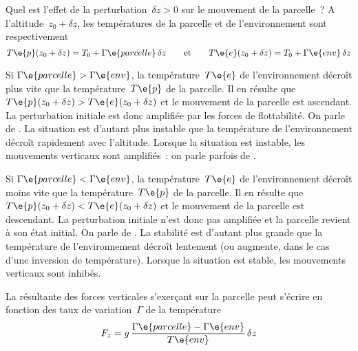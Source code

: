 \sk
Quel est l'effet de la perturbation~$\delta z > 0$ sur le mouvement de la parcelle~? A l'altitude~$z_0 + \delta z$, les températures de la parcelle et de l'environnement sont respectivement
\[ T\e{p}(z_0 + \delta z) = T_0 + \Gamma\e{parcelle} \, \delta z 
\qquad \text{et} \qquad
T\e{e}(z_0 + \delta z) = T_0 + \Gamma\e{env} \, \delta z \]
\begin{finger}
\item Si $\Gamma\e{parcelle} > \Gamma\e{env}$, la température~$T\e{e}$ de l'environnement décroît plus vite que la température~$T\e{p}$ de la parcelle. Il en résulte que~$T\e{p}(z_0 + \delta z) > T\e{e}(z_0 + \delta z)$ et le mouvement de la parcelle est ascendant. La perturbation initiale est donc amplifiée par les forces de flottabilité. On parle de . La situation est d'autant plus instable que la température de l'environnement décroît rapidement avec l'altitude. Lorsque la situation est instable, les mouvements verticaux sont amplifiés~: on parle parfois de .
\item Si $\Gamma\e{parcelle} < \Gamma\e{env}$, la température~$T\e{e}$ de l'environnement décroît moins vite que la température~$T\e{p}$ de la parcelle. Il en résulte que~$T\e{p}(z_0 + \delta z) < T\e{e}(z_0 + \delta z)$ et le mouvement de la parcelle est descendant. La perturbation initiale n'est donc pas amplifiée et la parcelle revient à son état initial. On parle de . La stabilité est d'autant plus grande que la température de l'environnement décroît lentement (ou augmente, dans le cas d'une inversion de température). Lorsque la situation est stable, les mouvements verticaux sont inhibés.
\end{finger}
La résultante des forces verticales s'exerçant sur la parcelle peut s'écrire en fonction des taux de variation~$\Gamma$ de la température
\[ F_z = g \, \frac{\Gamma\e{parcelle}-\Gamma\e{env}}{T\e{env}} \, \delta z \]



